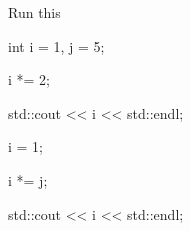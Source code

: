 Run this

\begin{console}

int i = 1, j = 5;



i *= 2;

std::cout << i << std::endl;



i = 1;

i *= j;

std::cout << i << std::endl;

\end{console}

